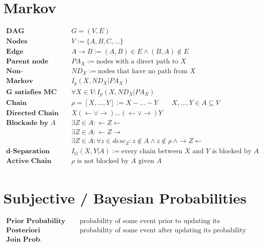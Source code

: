 \documentclass{article}
\begin{document}
	\section*{Markov}
		\begin{align*}
			\textbf{DAG } & G = (V,E)\\
			\textbf{Nodes } & V := \{A, B, C, ...\}\\
			\textbf{Edge } & A \rightarrow B := (A,B) \in E \wedge (B,A) \not\in E\\
			\textbf{Parent node } & PA_X := \text{nodes with a direct path to }X \\
			\textbf{Non-Descendants } & ND_X := \text{nodes that have no path from }X\\
			\textbf{Markov Condition } & I_p(X, ND_X | PA_X)\\
			\textbf{G satisfies MC } & \forall X \in V: I_p(X, ND_X | PA_X)\\
			\textbf{Chain } & \rho = [X,..., Y] := X - ... - Y\qquad X,...,Y \in A \subseteq V\\
			\textbf{Directed Chain } & X (\leftarrow \vee \rightarrow) ...(\leftarrow \vee \rightarrow) Y\\
			\textbf{Blockade by $A$ } & \exists Z \in A: \leftarrow Z \leftarrow \\
			& \exists Z \in A: \leftarrow Z \rightarrow\\
			& \exists Z \in A: \forall z \in desc_Z: z \not\in A \wedge z \not\in \rho\ \wedge \rightarrow Z \leftarrow\\
			\textbf{d-Separation } & I_G(X,Y|A) := \text{every chain between $X$ and $Y$ is blocked by $A$}\\
			\textbf{Active Chain } & \rho \text{ is not blocked by $A$ given $A$}\\
		\end{align*}
	\section*{Subjective / Bayesian Probabilities}
		\begin{align*}
			\textbf{Prior Probability } & \text{probability of some event prior to updating its probability using new information.}\\
			\textbf{Posteriori Probability } & \text{probability of some event after updating its probability based on new information.}\\
			\textbf{Join Prob. Distribution } & \text{}\\
		\end{align*}
\end{document}
